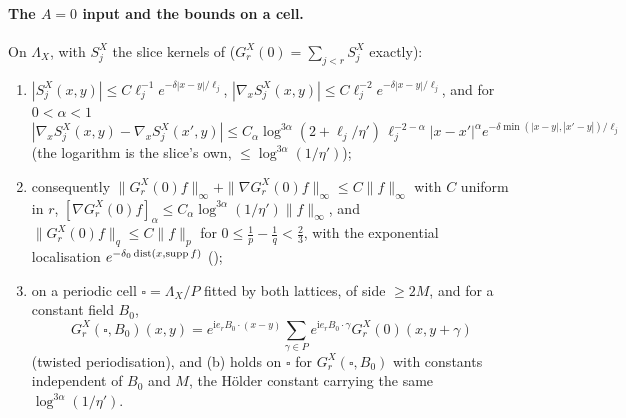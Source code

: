 
\paragraph{The $A=0$ input and the bounds on a cell.}

\begin{lemma}[$A=0$ bounds for the hybrid flow]\label{rot:hyb:lem:A0}
On $\Lambda_X$, with $S^X_j$ the slice kernels of  ($G^X_r(0)=\sum_{j<r}S^X_j$ exactly):
\begin{enumerate}[label=\textup{(\alph*)},leftmargin=*]
\item $|S^X_j(x,y)|\le C\ell_j^{-1}e^{-\delta|x-y|/\ell_j}$, $|\nabla_xS^X_j(x,y)|\le C\ell_j^{-2}e^{-\delta|x-y|/\ell_j}$, and for $0<\alpha<1$
\[
|\nabla_xS^X_j(x,y)-\nabla_xS^X_j(x',y)|\le C_\alpha\log^{3\alpha}(2+\ell_j/\eta')\,\ell_j^{-2-\alpha}|x-x'|^\alpha e^{-\delta\min(|x-y|,|x'-y|)/\ell_j}
\]
(the logarithm is the slice's own, $\le\log^{3\alpha}(1/\eta')$);
\item consequently $\|G^X_r(0)f\|_\infty+\|\nabla G^X_r(0)f\|_\infty\le C\|f\|_\infty$ with $C$ uniform in $r$, $[\nabla G^X_r(0)f]_\alpha\le C_\alpha\log^{3\alpha}(1/\eta')\|f\|_\infty$, and $\|G^X_r(0)f\|_q\le C\|f\|_p$ for $0\le\frac1p-\frac1q<\frac23$, with the exponential localisation $e^{-\delta_0\operatorname{dist}(x,\operatorname{supp} f)}$ (\cite[(2.16)--(2.17)]{Ba4});
\item on a periodic cell $\square=\Lambda_X/P$ fitted by both lattices, of side $\ge2M$, and for a constant field $B_0$,
\[
G^X_r(\square,B_0)(x,y)=e^{\mathrm ie_rB_0\cdot(x-y)}\sum_{\gamma\in P}e^{\mathrm ie_rB_0\cdot\gamma}G^X_r(0)(x,y+\gamma)
\]
(twisted periodisation), and (b) holds on $\square$ for $G^X_r(\square,B_0)$ with constants independent of $B_0$ and $M$, the H\"older constant carrying the same $\log^{3\alpha}(1/\eta')$.
\end{enumerate}
\end{lemma}
